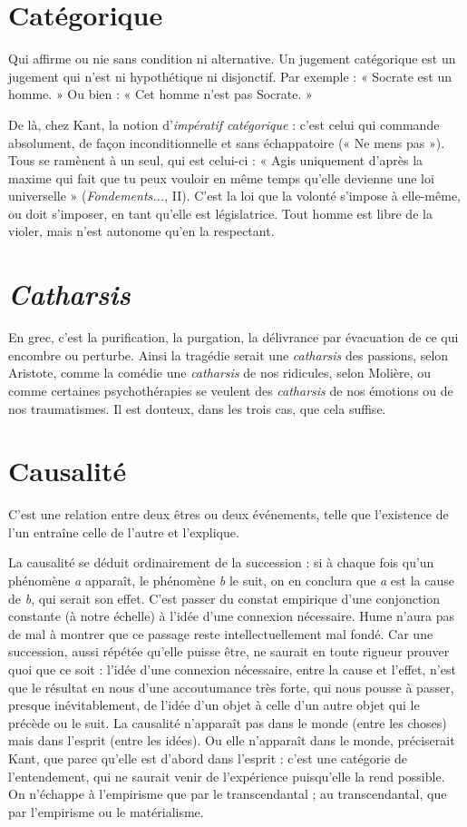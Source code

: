 \section{Catégorique}
Qui affirme ou nie sans condition ni alternative. Un jugement
catégorique est un jugement qui n’est ni hypothétique
ni disjonctif. Par exemple : « Socrate est un homme. » Ou bien : « Cet
homme n’est pas Socrate. »

De là, chez Kant, la notion d’{\it impératif catégorique} : c'est celui qui commande
absolument, de façon inconditionnelle et sans échappatoire (« Ne mens
pas »). Tous se ramènent à un seul, qui est celui-ci : « Agis uniquement d’après
la maxime qui fait que tu peux vouloir en même temps qu’elle devienne une loi
universelle » ({\it Fondements...}, II). C’est la loi que la volonté s’impose à elle-même,
ou doit s'imposer, en tant qu’elle est législatrice. Tout homme est libre
de la violer, mais n’est autonome qu’en la respectant.

\section{\it Catharsis}
En grec, c’est la purification, la purgation, la délivrance par
évacuation de ce qui encombre ou perturbe. Ainsi la tragédie
serait une {\it catharsis} des passions, selon Aristote, comme la comédie une {\it catharsis}
de nos ridicules, selon Molière, ou comme certaines psychothérapies se veulent
des {\it catharsis} de nos émotions ou de nos traumatismes. Il est douteux, dans les
trois cas, que cela suffise.

\section{Causalité}
C’est une relation entre deux êtres ou deux événements, telle
que l'existence de l’un entraîne celle de l’autre et l'explique.

La causalité se déduit ordinairement de la succession : si à chaque fois
qu’un phénomène {\it a} apparaît, le phénomène {\it b} le suit, on en conclura que {\it a} est
la cause de {\it b}, qui serait son effet. C’est passer du constat empirique d’une
conjonction constante (à notre échelle) à l’idée d’une connexion nécessaire.
Hume n’aura pas de mal à montrer que ce passage reste intellectuellement mal
fondé. Car une succession, aussi répétée qu’elle puisse être, ne saurait en toute
rigueur prouver quoi que ce soit : l’idée d’une connexion nécessaire, entre la
cause et l’effet, n’est que le résultat en nous d’une accoutumance très forte, qui
nous pousse à passer, presque inévitablement, de l’idée d’un objet à celle d’un
autre objet qui le précède ou le suit. La causalité n’apparaît pas dans le monde
(entre les choses) mais dans l'esprit (entre les idées). Ou elle n’apparaît dans le
monde, préciserait Kant, que parce qu’elle est d’abord dans l'esprit : c’est une
catégorie de l’entendement, qui ne saurait venir de l'expérience puisqu'elle la
rend possible. On n’échappe à l’empirisme que par le transcendantal ; au transcendantal,
que par l’empirisme ou le matérialisme.

